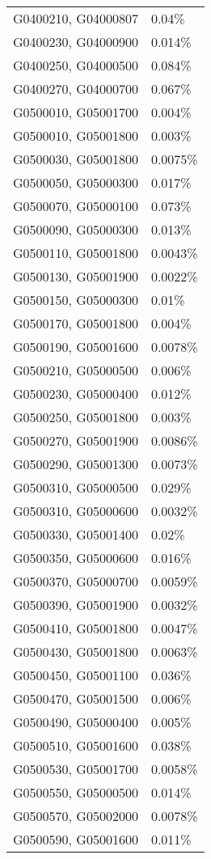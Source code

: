 \begin{longtable}[]{@{}ll@{}}
G0400210, G04000807 & 0.04\% \\
G0400230, G04000900 & 0.014\% \\
G0400250, G04000500 & 0.084\% \\
G0400270, G04000700 & 0.067\% \\
G0500010, G05001700 & 0.004\% \\
G0500010, G05001800 & 0.003\% \\
G0500030, G05001800 & 0.0075\% \\
G0500050, G05000300 & 0.017\% \\
G0500070, G05000100 & 0.073\% \\
G0500090, G05000300 & 0.013\% \\
G0500110, G05001800 & 0.0043\% \\
G0500130, G05001900 & 0.0022\% \\
G0500150, G05000300 & 0.01\% \\
G0500170, G05001800 & 0.004\% \\
G0500190, G05001600 & 0.0078\% \\
G0500210, G05000500 & 0.006\% \\
G0500230, G05000400 & 0.012\% \\
G0500250, G05001800 & 0.003\% \\
G0500270, G05001900 & 0.0086\% \\
G0500290, G05001300 & 0.0073\% \\
G0500310, G05000500 & 0.029\% \\
G0500310, G05000600 & 0.0032\% \\
G0500330, G05001400 & 0.02\% \\
G0500350, G05000600 & 0.016\% \\
G0500370, G05000700 & 0.0059\% \\
G0500390, G05001900 & 0.0032\% \\
G0500410, G05001800 & 0.0047\% \\
G0500430, G05001800 & 0.0063\% \\
G0500450, G05001100 & 0.036\% \\
G0500470, G05001500 & 0.006\% \\
G0500490, G05000400 & 0.005\% \\
G0500510, G05001600 & 0.038\% \\
G0500530, G05001700 & 0.0058\% \\
G0500550, G05000500 & 0.014\% \\
G0500570, G05002000 & 0.0078\% \\
G0500590, G05001600 & 0.011\% \\

\end{longtable}
